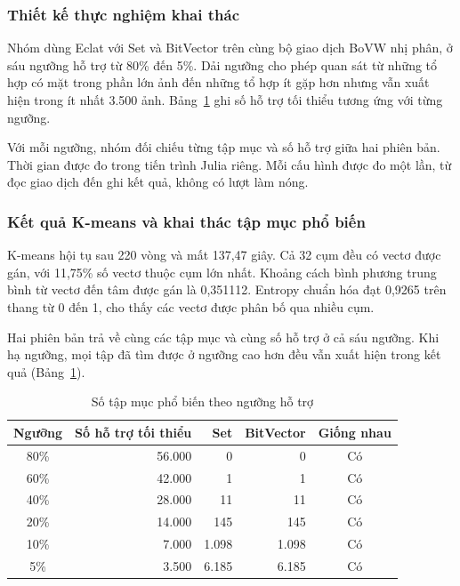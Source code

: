 \subsubsection{Thiết kế thực nghiệm khai thác}
Nhóm dùng Eclat với Set và BitVector trên cùng bộ giao dịch BoVW
nhị phân, ở sáu ngưỡng hỗ trợ từ 80\% đến 5\%. Dải ngưỡng cho
phép quan sát từ những tổ hợp có mặt trong phần lớn ảnh đến
những tổ hợp ít gặp hơn nhưng vẫn xuất hiện trong ít nhất
3.500 ảnh. Bảng~\ref{tab:eclat_backend_comparison} ghi số hỗ trợ
tối thiểu tương ứng với từng ngưỡng.

Với mỗi ngưỡng, nhóm đối chiếu từng tập mục và số hỗ trợ giữa
hai phiên bản. Thời gian được đo trong tiến trình Julia riêng.
Mỗi cấu hình được đo một lần, từ đọc giao dịch đến ghi kết quả,
không có lượt làm nóng.

\subsubsection{Kết quả K-means và khai thác tập mục phổ biến}
\label{subsec:fashion_fim_results}

K-means hội tụ sau 220 vòng và mất 137,47 giây. Cả 32 cụm đều
có vectơ được gán, với 11,75\% số vectơ thuộc cụm lớn nhất.
Khoảng cách bình phương trung bình từ vectơ đến tâm được gán
là 0,351112. Entropy chuẩn hóa đạt 0,9265 trên thang từ 0 đến 1,
cho thấy các vectơ được phân bố qua nhiều cụm.

Hai phiên bản trả về cùng các tập mục và cùng số hỗ trợ ở cả
sáu ngưỡng. Khi hạ ngưỡng, mọi tập đã tìm được ở ngưỡng cao hơn
đều vẫn xuất hiện trong kết quả (Bảng~\ref{tab:eclat_backend_comparison}).

\begin{table}[!t]
    \centering
    \caption{Số tập mục phổ biến theo ngưỡng hỗ trợ}
    \label{tab:eclat_backend_comparison}
    \footnotesize
    \setlength{\tabcolsep}{4pt}
    \begin{tabular}{@{}c r r r c@{}}
        \toprule
        \textbf{Ngưỡng} & \textbf{Số hỗ trợ tối thiểu} &
        \textbf{Set} & \textbf{BitVector} & \textbf{Giống nhau} \\
        \midrule
        80\% & 56.000 & 0 & 0 & Có \\
        60\% & 42.000 & 1 & 1 & Có \\
        40\% & 28.000 & 11 & 11 & Có \\
        20\% & 14.000 & 145 & 145 & Có \\
        10\% & 7.000 & 1.098 & 1.098 & Có \\
         5\% & 3.500 & 6.185 & 6.185 & Có \\
        \bottomrule
    \end{tabular}
\end{table}

